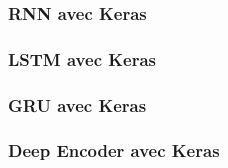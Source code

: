 \begin{frame}
  \frametitle{RNN avec Keras}
\end{frame}

\begin{frame}
  \frametitle{LSTM avec Keras}
\end{frame}

\begin{frame}
  \frametitle{GRU avec Keras}
\end{frame}

\begin{frame}
  \frametitle{Deep Encoder avec Keras}
\end{frame}

